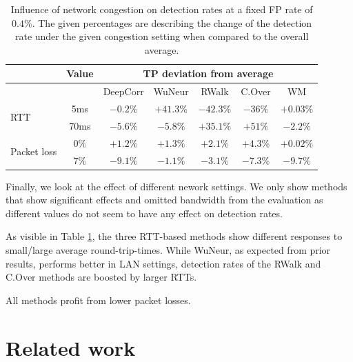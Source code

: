 \documentclass[runningheads]{llncs}\usepackage[]{graphicx}\usepackage[]{color}
\begin{document}
\begin{table}
\centering
\begin{tabular}{l|c|c|c|c|c|c}
& Value & \multicolumn{5}{c}{TP deviation from average}\\ \hline
 & &DeepCorr & WuNeur & RWalk& C.Over & WM \\ \hline
\multirow{2}{*}{RTT} & 5ms& $-0.2\%$ & $+41.3\%$& $-42.3\%$ & $-36\%$ & $+0.03\%$ \\ \cline{2-7}
 & 70ms  & $-5.6\%$ & $-5.8\%$& $+35.1\%$ & $+51\%$& $-2.2\%$\\ \hline

\multirow{2}{*}{Packet loss} & $0\%$ & $+1.2\%$&  $+1.3\%$ & $+2.1\%$ & $+4.3\%$ & $+0.02\%$\\ \cline{2-7}
 & $7\%$  & $-9.1\%$& $-1.1\%$ & $-3.1\%$ & $-7.3\%$ & $-9.7\%$\\ \hline

\end{tabular}
\caption{Influence of network congestion on detection rates at a fixed FP rate of $0.4\%$. The given percentages are describing the change of the detection rate under the given congestion setting when compared to the overall average.}\label{Tab:Congestion}
\end{table}

Finally, we look at the effect of different nework settings. We only show methods that show significant effects and omitted bandwidth from the evaluation as different values do not seem to have any effect on detection rates.

As visible in Table \ref{Tab:Congestion}, the three RTT-based methods show different responses to small/large average round-trip-times. While WuNeur, as expected from prior results, performs better in LAN settings, detection rates of the RWalk and C.Over methods are boosted by larger RTTs. 

All methods profit from lower packet losses.


\section{Related work}\label{Sec:Relatedwork}
\end{document}
